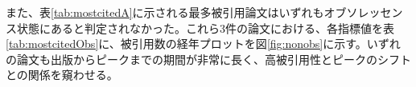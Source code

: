また、表\ref{tab:mostcitedA}に示される最多被引用論文はいずれもオブソレッセンス状態にあると判定されなかった。これら3件の論文における、各指標値を表\ref{tab:mostcitedObs}に、被引用数の経年プロットを図\ref{fig:nonobs}に示す。いずれの論文も出版からピークまでの期間が非常に長く、高被引用性とピークのシフトとの関係を窺わせる。
